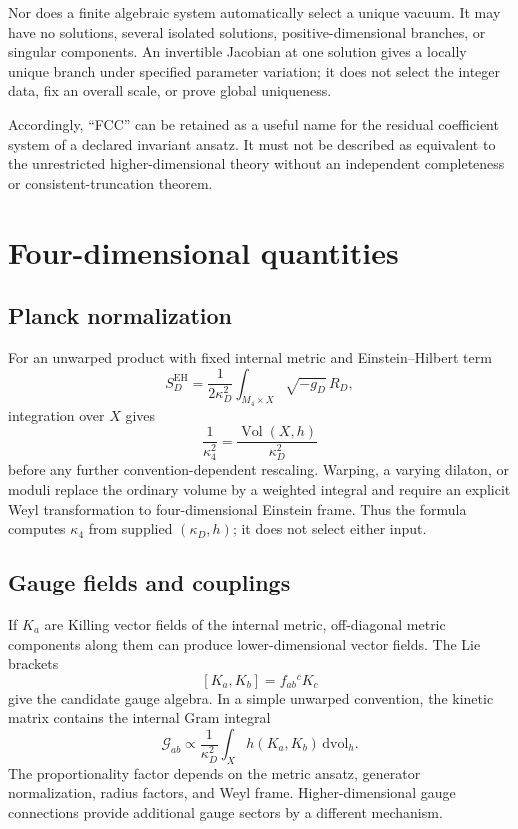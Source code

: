 \documentclass[11pt]{article}
\theoremstyle{definition}
\theoremstyle{remark}
\newcommand{\dd}{\mathrm d}
\newcommand{\cG}{\mathcal G}
\newcommand{\Vol}{\operatorname{Vol}}
\begin{document}
Nor does a finite algebraic system automatically select a unique vacuum.
It may have no solutions, several isolated solutions, positive-dimensional
branches, or singular components.  An invertible Jacobian at one solution
gives a locally unique branch under specified parameter variation; it does
not select the integer data, fix an overall scale, or prove global
uniqueness.

Accordingly, ``FCC'' can be retained as a useful name for the residual
coefficient system of a declared invariant ansatz.  It must not be described
as equivalent to the unrestricted higher-dimensional theory without an
independent completeness or consistent-truncation theorem.

\section{Four-dimensional quantities}
\label{sec:outputs}

\subsection{Planck normalization}

For an unwarped product with fixed internal metric and Einstein--Hilbert
term
\[
 S_D^{\mathrm{EH}}
 =
 \frac{1}{2\kappa_D^2}
 \int_{M_4\times X}\sqrt{-g_D}\,R_D,
\]
integration over \(X\) gives
\[
 \frac{1}{\kappa_4^2}
 =
 \frac{\Vol(X,h)}{\kappa_D^2}
\]
before any further convention-dependent rescaling.  Warping, a varying
dilaton, or moduli replace the ordinary volume by a weighted integral and
require an explicit Weyl transformation to four-dimensional Einstein frame.
Thus the formula computes \(\kappa_4\) from supplied
\((\kappa_D,h)\); it does not select either input.

\subsection{Gauge fields and couplings}

If \(K_a\) are Killing vector fields of the internal metric, off-diagonal
metric components along them can produce lower-dimensional vector fields.
The Lie brackets
\[
 [K_a,K_b]=f_{ab}{}^{c}K_c
\]
give the candidate gauge algebra.  In a simple unwarped convention, the
kinetic matrix contains the internal Gram integral
\[
 \cG_{ab}
 \propto
 \frac{1}{\kappa_D^2}
 \int_X
 h(K_a,K_b)\,\dd\mathrm{vol}_h .
\]
The proportionality factor depends on the metric ansatz, generator
normalization, radius factors, and Weyl frame.  Higher-dimensional gauge
connections provide additional gauge sectors by a different mechanism.
\end{document}
